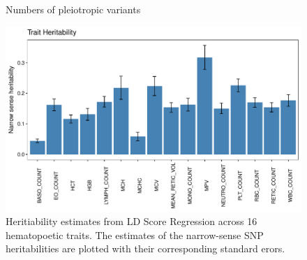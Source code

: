 \documentclass{article}\usepackage[]{graphicx}\usepackage[]{color}
\makeatletter
\def\maxwidth{ %
  \ifdim\Gin@nat@width>\linewidth
    \linewidth
  \else
    \Gin@nat@width
  \fi
}
\newenvironment{knitrout}{}{} %
\makeatother
\begin{document}
\begin{enumerate}[label=(\Alph*)]
\begin{knitrout}
\begin{figure}[H]
{}

\caption[Numbers of pleiotropic variants]{Numbers of pleiotropic variants}\label{fig:pleiotropyPlots}
\end{figure}


\end{knitrout}

\begin{knitrout}
\color{fgcolor}\begin{figure}[H]

{\centering \includegraphics[width=\maxwidth]{figure/heritabilityPlots-1} 

}

\caption[Heritiability estimates from LD Score Regression across 16 hematopoetic traits]{Heritiability estimates from LD Score Regression across 16 hematopoetic traits. The estimates of the narrow-sense SNP heritabilities are plotted with their corresponding standard erors.}\label{fig:heritabilityPlots}
\end{figure}


\end{knitrout}

\begin{knitrout}
\color{fgcolor}\begin{figure}[H]


\end{figure}
\end{knitrout}
\end{enumerate}
\end{document}
